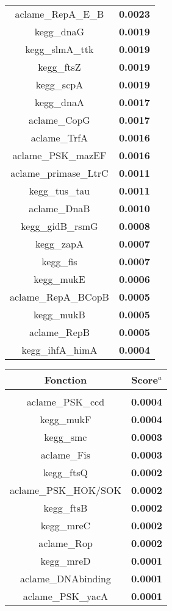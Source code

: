 \begin{table}[H]
\begin{minipage}[t]{0.3\textwidth}
\begin{scriptsize}
\begin{tabular}{c>{\bfseries}c}
aclame\_RepA\_E\_B&0.0023\\
kegg\_dnaG&0.0019\\
kegg\_slmA\_ttk&0.0019\\
kegg\_ftsZ&0.0019\\
kegg\_scpA&0.0019\\
kegg\_dnaA&0.0017\\
aclame\_CopG&0.0017\\
aclame\_TrfA&0.0016\\
aclame\_PSK\_mazEF&0.0016\\
aclame\_primase\_LtrC&0.0011\\
kegg\_tus\_tau&0.0011\\
aclame\_DnaB&0.0010\\
kegg\_gidB\_rsmG&0.0008\\
kegg\_zapA&0.0007\\
kegg\_fis&0.0007\\
kegg\_mukE&0.0006\\
aclame\_RepA\_BCopB&0.0005\\
kegg\_mukB&0.0005\\
aclame\_RepB&0.0005\\
kegg\_ihfA\_himA&0.0004\\
\end{tabular}
\end{scriptsize}
\end{minipage}
\hspace{1cm}
\begin{minipage}[t]{0.3\textwidth}
\vspace{0cm}
\centering
\begin{scriptsize}
\begin{tabular}{c>{\bfseries}c}
Fonction & Score$^{a}$\\
\hline
\\[-0.2cm]
aclame\_PSK\_ccd&0.0004\\
kegg\_mukF&0.0004\\
kegg\_smc&0.0003\\
aclame\_Fis&0.0003\\
kegg\_ftsQ&0.0002\\
aclame\_PSK\_HOK/SOK&0.0002\\
kegg\_ftsB&0.0002\\
kegg\_mreC&0.0002\\
aclame\_Rop&0.0002\\
kegg\_mreD&0.0001\\
aclame\_DNAbinding&0.0001\\
aclame\_PSK\_yacA&0.0001\\

\end{tabular}
\end{scriptsize}
\end{minipage}
\end{table}
